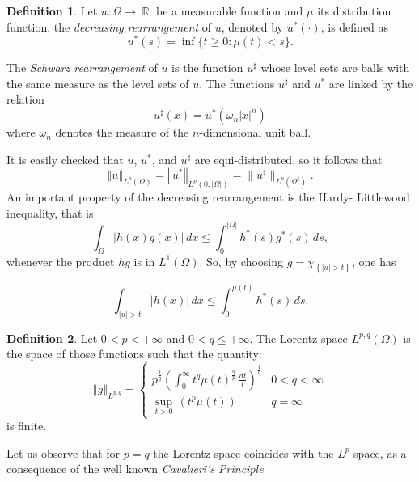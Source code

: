 \documentclass[12pt]{article}
\newcommand{\abs}[1]{{\left|#1\right|}}
\newcommand{\norma}[1]{{\left\Vert#1\right\Vert}}
\theoremstyle{definition}
\newtheorem{definizione}{Definition}[section]
\theoremstyle{plain}
\theoremstyle{definition}
\DeclareMathOperator{\R}{\mathbb{R}}
\begin{document}
\begin{definizione}
	Let $u: \Omega \to \R$ be a measurable function and $\mu$ its distribution function, the \emph{decreasing rearrangement} of $u$, denoted by $u^\ast(\cdot)$, is defined as
    $$u^*(s)=\inf\{t\geq 0:\mu(t)<s\}.$$
	
	\noindent The \emph{Schwarz rearrangement} of $u$ is the function $u^\sharp $ whose level sets are balls with the same measure as the level sets of $u$. The functions $u^\sharp$ and $u^*$ are linked by the relation
	$$u^\sharp (x)= u^*(\omega_n \abs{x}^n)$$
    where $\omega_n$ denotes the measure of the $n$-dimensional unit ball.
\end{definizione}
\noindent It is easily checked that $u$, $u^*$, and $u^\sharp$ are equi-distributed, so it follows that
$$ \displaystyle{\norma{u}_{L^p(\Omega)}=\norma{u^*}_{L^p(0, \abs{\Omega})}=\lVert{u^\sharp}\rVert_{L^p(\Omega^\sharp)}}.$$
An important property of the decreasing rearrangement is the Hardy- Littlewood inequality, that is
\begin{equation*}
 \int_{\Omega} \abs{h(x)g(x)} \, dx \le \int_{0}^{\abs{\Omega}} h^*(s) g^*(s) \, ds,
\end{equation*}
whenever the product $hg$ is in $L^1(\Omega)$. So, by choosing $g=\chi_{\left\lbrace\abs{u}>t\right\rbrace}$, one has


\begin{equation*}
\int_{\abs{u}>t} \abs{h(x)} \, dx \le \int_{0}^{\mu(t)} h^*(s) \, ds.
\end{equation*}

\begin{definizione}
Let $0<p<+\infty$ and $0<q\le +\infty$. The Lorentz space $L^{p,q}(\Omega)$ is the space of those functions such that the quantity:
\begin{equation*}
    \norma{g}_{L^{p,q}} =
    \begin{cases}
   	\displaystyle{ p^{\frac{1}{q}} \left( \int_{0}^{\infty}  t^{q} \mu(t)^{\frac{q}{p}}\, \frac{dt}{t}\right)^{\frac{1}{q}}} & 0<q<\infty\\
	 \displaystyle{\sup_{t>0} \, (t^p \mu(t))} & q=\infty
	\end{cases}
\end{equation*}
is finite.
\end{definizione}
	
\noindent Let us observe that for $p=q$ the Lorentz space coincides with the  $L^p$ space, as a consequence of the well known \emph{Cavalieri's Principle}
\end{document}
